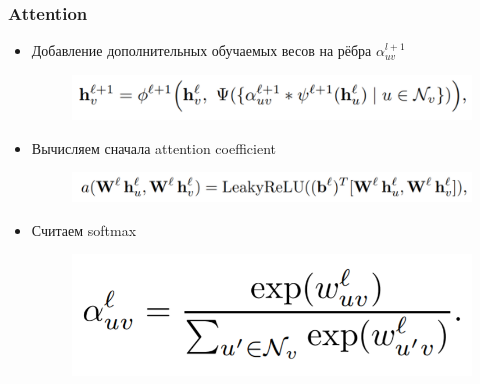 \documentclass{beamer}
\begin{document}
\begin{frame}
\frametitle{Attention}
\begin{itemize}
	\item Добавление дополнительных обучаемых весов на рёбра $\alpha_{uv}^{l + 1}$
\begin{figure}
	\includegraphics[width=0.8\columnwidth]{attention.png}
\end{figure}
	\item Вычисляем сначала attention coefficient
\begin{figure}
	\includegraphics[width=0.9\columnwidth]{attention_coefficient.png}
\end{figure}
	\item Считаем softmax
\begin{figure}
	\includegraphics[width=0.5\columnwidth]{attention_softmax.png}
\end{figure}
	
	
\end{itemize}
\end{frame}
\end{document}
